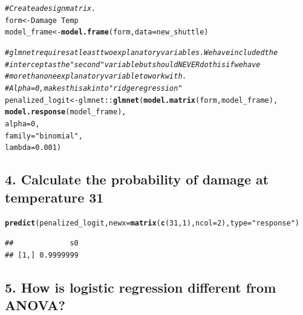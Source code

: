\documentclass{article}\usepackage[]{graphicx}\usepackage[]{color}
\makeatletter
\newcommand{\hlnum}[1]{\textcolor[rgb]{0.686,0.059,0.569}{#1}}%
\newcommand{\hlstr}[1]{\textcolor[rgb]{0.192,0.494,0.8}{#1}}%
\newcommand{\hlcom}[1]{\textcolor[rgb]{0.678,0.584,0.686}{\textit{#1}}}%
\newcommand{\hlopt}[1]{\textcolor[rgb]{0,0,0}{#1}}%
\newcommand{\hlstd}[1]{\textcolor[rgb]{0.345,0.345,0.345}{#1}}%
\newcommand{\hlkwb}[1]{\textcolor[rgb]{0.69,0.353,0.396}{#1}}%
\newcommand{\hlkwc}[1]{\textcolor[rgb]{0.333,0.667,0.333}{#1}}%
\newcommand{\hlkwd}[1]{\textcolor[rgb]{0.737,0.353,0.396}{\textbf{#1}}}%
\newenvironment{kframe}{%
 \def\at@end@of@kframe{}%
 \ifinner\ifhmode%
  \def\at@end@of@kframe{\end{minipage}}%
  \begin{minipage}{\columnwidth}%
 \fi\fi%
 \def\FrameCommand##1{\hskip\@totalleftmargin \hskip-\fboxsep
 \colorbox{shadecolor}{##1}\hskip-\fboxsep
     \hskip-\linewidth \hskip-\@totalleftmargin \hskip\columnwidth}%
 \MakeFramed {\advance\hsize-\width
   \@totalleftmargin\z@ \linewidth\hsize
   \@setminipage}}%
 {\par\unskip\endMakeFramed%
 \at@end@of@kframe}
\newenvironment{knitrout}{}{} %
\makeatother
\begin{document}
\begin{knitrout}
\color{fgcolor}\begin{kframe}
\begin{alltt}
\hlcom{# Create a design matrix. }
\hlstd{form} \hlkwb{<-} \hlstd{Damage} \hlopt{~} \hlstd{Temp}
\hlstd{model_frame} \hlkwb{<-} \hlkwd{model.frame}\hlstd{(form,} \hlkwc{data} \hlstd{= new_shuttle)}

\hlcom{# glmnet requires at least two explanatory variables. We have included the }
\hlcom{# intercept as the "second" variable but should NEVER do this if we have }
\hlcom{# more than one explanatory variable to work with. }
\hlcom{# Alpha = 0, makes this akin to "ridge regression"}
\hlstd{penalized_logit} \hlkwb{<-} \hlstd{glmnet}\hlopt{::}\hlkwd{glmnet}\hlstd{(}\hlkwd{model.matrix}\hlstd{(form, model_frame),}
                              \hlkwd{model.response}\hlstd{(model_frame),}
                              \hlkwc{alpha} \hlstd{=} \hlnum{0}\hlstd{,}
                              \hlkwc{family} \hlstd{=} \hlstr{"binomial"}\hlstd{,}
                              \hlkwc{lambda} \hlstd{=} \hlnum{0.001}\hlstd{)}
\end{alltt}
\end{kframe}
\end{knitrout}

\subsection*{4. Calculate the probability of damage at temperature 31}

\begin{knitrout}
\color{fgcolor}\begin{kframe}
\begin{alltt}
\hlkwd{predict}\hlstd{(penalized_logit,} \hlkwc{newx} \hlstd{=} \hlkwd{matrix}\hlstd{(}\hlkwd{c}\hlstd{(}\hlnum{31}\hlstd{,} \hlnum{1}\hlstd{),} \hlkwc{ncol} \hlstd{=} \hlnum{2}\hlstd{),} \hlkwc{type} \hlstd{=} \hlstr{"response"}\hlstd{)}
\end{alltt}
\begin{verbatim}
##             s0
## [1,] 0.9999999
\end{verbatim}
\end{kframe}
\end{knitrout}

\subsection*{5. How is logistic regression different from ANOVA?}
\end{document}
